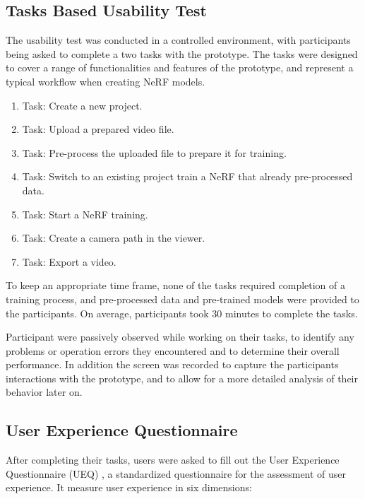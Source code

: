 \subsection{Tasks Based Usability Test}
\label{sec:methodology:study:tasks}

The usability test was conducted in a controlled environment, with participants being asked to complete a two tasks with the prototype.
The tasks were designed to cover a range of functionalities and features of the prototype, and represent a typical workflow when creating NeRF models.

\begin{enumerate}
  \item Task: Create a new project.
  \item Task: Upload a prepared video file.
  \item Task: Pre-process the uploaded file to prepare it for training.
  \item Task: Switch to an existing project train a NeRF that already pre-processed data.
  \item Task: Start a NeRF training.
  \item Task: Create a camera path in the viewer.
  \item Task: Export a video.
\end{enumerate}

To keep an appropriate time frame, none of the tasks required completion of a training process, and pre-processed data and pre-trained models were provided to the participants.
On average, participants took 30 minutes to complete the tasks. %

Participant were passively observed while working on their tasks, to identify any problems or operation errors they encountered and to determine their overall performance.
In addition the screen was recorded to capture the participants interactions with the prototype, and to allow for a more detailed analysis of their behavior later on.

\subsection{User Experience Questionnaire}
\label{sec:methodology:study:ueq}

After completing their tasks, users were asked to fill out the User Experience Questionnaire (UEQ) \cite{laugwitz_construction_2008}, a standardized questionnaire for the assessment of user experience.
It measure user experience in six dimensions:

